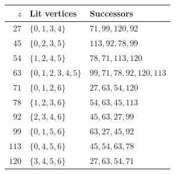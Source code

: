 \begin{tabular}{rll}
\hline
$z$ & Lit vertices & Successors \\
\hline
$27$ & $\{0,1,3,4\}$ & $71,99,120,92$ \\
$45$ & $\{0,2,3,5\}$ & $113,92,78,99$ \\
$54$ & $\{1,2,4,5\}$ & $78,71,113,120$ \\
$63$ & $\{0,1,2,3,4,5\}$ & $99,71,78,92,120,113$ \\
$71$ & $\{0,1,2,6\}$ & $27,63,54,120$ \\
$78$ & $\{1,2,3,6\}$ & $54,63,45,113$ \\
$92$ & $\{2,3,4,6\}$ & $45,63,27,99$ \\
$99$ & $\{0,1,5,6\}$ & $63,27,45,92$ \\
$113$ & $\{0,4,5,6\}$ & $45,54,63,78$ \\
$120$ & $\{3,4,5,6\}$ & $27,63,54,71$ \\
\hline
\end{tabular}
